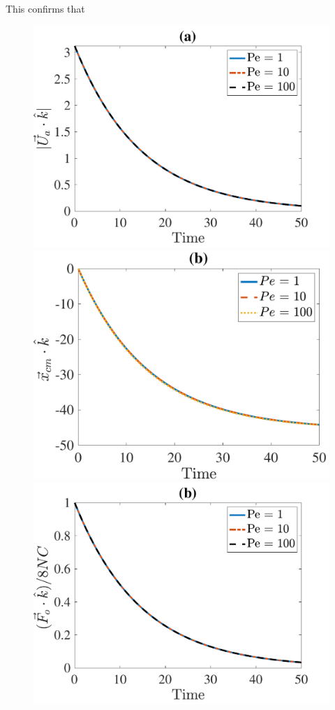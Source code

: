 This confirms that 
\begin{figure}[ht]
	\begin{center}
		\includegraphics[scale=0.35]{./figures/fig_NC50_Pe_Ua3_all}
		\includegraphics[scale=0.35]{./figures/fig_NC50_Pe_cm3_all}
		\includegraphics[scale=0.35]{./figures/fig_NC50_Pe_Fo3_all}

\end{center}
\end{figure}
